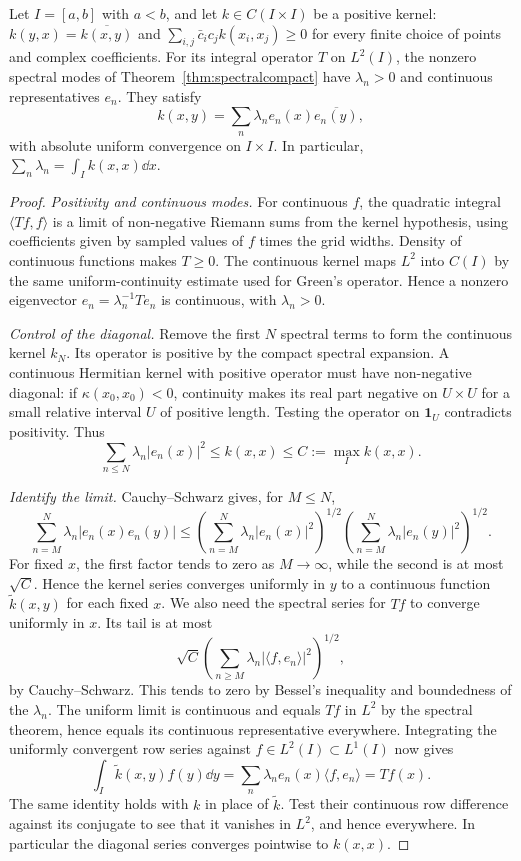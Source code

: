 \begin{theorem}[Mercer, 1909]\label{thm:mercer}
Let $I=[a,b]$ with $a<b$, and let $k\in C(I\times I)$ be a positive kernel: $k(y,x)=\overline{k(x,y)}$ and $\sum_{i,j}\bar c_ic_jk(x_i,x_j)\ge0$ for every finite choice of points and complex coefficients. For its integral operator $T$ on $L^2(I)$, the nonzero spectral modes of Theorem~\ref{thm:spectralcompact} have $\lambda_n>0$ and continuous representatives $e_n$. They satisfy
\[
k(x,y)=\sum_n\lambda_ne_n(x)\overline{e_n(y)},
\]
with absolute uniform convergence on $I\times I$. In particular, $\sum_n\lambda_n=\int_Ik(x,x)\dd x$.
\end{theorem}
\begin{proof}
\emph{Positivity and continuous modes.} For continuous $f$, the quadratic integral $\langle Tf,f\rangle$ is a limit of non-negative Riemann sums from the kernel hypothesis, using coefficients given by sampled values of $f$ times the grid widths. Density of continuous functions makes $T\ge0$. The continuous kernel maps $L^2$ into $C(I)$ by the same uniform-continuity estimate used for Green's operator. Hence a nonzero eigenvector $e_n=\lambda_n^{-1}Te_n$ is continuous, with $\lambda_n>0$.

\emph{Control of the diagonal.} Remove the first $N$ spectral terms to form the continuous kernel $k_N$. Its operator is positive by the compact spectral expansion. A continuous Hermitian kernel with positive operator must have non-negative diagonal: if $\kappa(x_0,x_0)<0$, continuity makes its real part negative on $U\times U$ for a small relative interval $U$ of positive length. Testing the operator on $\mathbf1_U$ contradicts positivity. Thus
\[
\sum_{n\le N}\lambda_n|e_n(x)|^2\le k(x,x)\le C:=\max_Ik(x,x).
\]

\emph{Identify the limit.} Cauchy--Schwarz gives, for $M\le N$,
\begin{equation}\label{eq:mercercs}
\sum_{n=M}^N\lambda_n|e_n(x)e_n(y)|
\le\left(\sum_{n=M}^N\lambda_n|e_n(x)|^2\right)^{1/2}
\left(\sum_{n=M}^N\lambda_n|e_n(y)|^2\right)^{1/2}.
\end{equation}
For fixed $x$, the first factor tends to zero as $M\to\infty$, while the second is at most $\sqrt C$. Hence the kernel series converges uniformly in $y$ to a continuous function $\tilde k(x,y)$ for each fixed $x$.
We also need the spectral series for $Tf$ to converge uniformly in $x$. Its tail is at most
\[
\sqrt C\left(\sum_{n\ge M}\lambda_n|\langle f,e_n\rangle|^2\right)^{1/2},
\]
by Cauchy--Schwarz. This tends to zero by Bessel's inequality and boundedness of the $\lambda_n$. The uniform limit is continuous and equals $Tf$ in $L^2$ by the spectral theorem, hence equals its continuous representative everywhere. Integrating the uniformly convergent row series against $f\in L^2(I)\subset L^1(I)$ now gives
\[
\int_I\tilde k(x,y)f(y)\dd y
=\sum_n\lambda_ne_n(x)\langle f,e_n\rangle=Tf(x).
\]
The same identity holds with $k$ in place of $\tilde k$. Test their continuous row difference against its conjugate to see that it vanishes in $L^2$, and hence everywhere. In particular the diagonal series converges pointwise to $k(x,x)$.


\end{proof}

